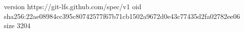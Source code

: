 version https://git-lfs.github.com/spec/v1
oid sha256:22ae08984cc395c80742577f67b71cb1502a9672d0e43c77435d2fa02782ee06
size 3204
